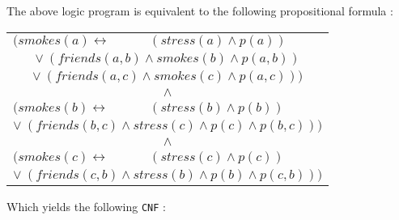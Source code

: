 \noindent The above logic program is equivalent to the following propositional formula :
\begin{center}
\begin{tabular}{ll}
$(smokes(a)\leftrightarrow$ & $(stress(a) \land p(a))$\\
\multicolumn{2}{c}{$\lor\ (friends(a,b) \land smokes(b) \land p(a,b))$}\\
\multicolumn{2}{c}{$\lor\ (friends(a,c) \land smokes(c) \land p(a,c)))$}\\
\multicolumn{2}{c}{$\land$}\\
$(smokes(b)\leftrightarrow$ & $(stress(b) \land p(b))$\\
\multicolumn{2}{c}{$\lor\ (friends(b,c) \land stress(c) \land p(c) \land p(b,c)))$}\\
\multicolumn{2}{c}{$\land$}\\
$(smokes(c)\leftrightarrow$ & $(stress(c) \land p(c))$\\
\multicolumn{2}{c}{$\lor\ (friends(c,b) \land stress(b) \land p(b) \land p(c,b)))$}\\
\end{tabular}
\end{center}

\vspace{0.1cm}
\par\noindent Which yields the following \texttt{CNF} :\vspace{0.2cm}\\











